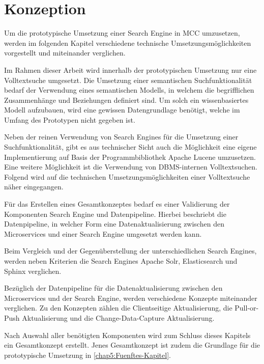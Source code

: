 \chapter{Konzeption\label{chap4:Viertes-Kapitel}}

Um die prototypische Umsetzung einer Search Engine in MCC umzusetzen, werden im folgenden Kapitel verschiedene technische Umsetzungsmöglichkeiten vorgestellt und miteinander verglichen.


Im Rahmen dieser Arbeit wird innerhalb der prototypischen Umsetzung nur eine Volltextsuche umgesetzt. Die Umsetzung einer semantischen Suchfunktionalität bedarf der Verwendung eines semantischen Modells, in welchem die begrifflichen Zusammenhänge und Beziehungen definiert sind. Um solch ein wissenbasiertes Modell aufzubauen, wird eine gewissen Datengrundlage benötigt, welche im Umfang des Prototypen nicht gegeben ist.

Neben der reinen Verwendung von Search Engines für die Umsetzung einer Suchfunktionalität, gibt es aus technischer Sicht auch die Möglichkeit eine eigene Implementierung auf Basis der Programmbibliothek \glqq Apache Lucene\grqq{} umzusetzen. Eine weitere Möglichkeit ist die Verwendung von DBMS-internen Volltextsuchen. Folgend wird auf die technischen Umsetzungsmöglichkeiten einer Volltextsuche näher eingegangen.

Für das Erstellen eines Gesamtkonzeptes bedarf es einer Validierung der Komponenten \glqq Search Engine\grqq{} und \glqq Datenpipeline\grqq{}. Hierbei beschriebt die Datenpipeline, in welcher Form eine Datenaktualisierung zwischen den Microservices und einer Search Engine umgesetzt werden kann.

Beim Vergleich und der Gegenüberstellung der unterschiedlichen Search Engines, werden neben Kriterien die Search Engines \glqq Apache Solr\grqq{}, \glqq Elasticsearch\grqq{} und \glqq Sphinx\grqq{} verglichen.

Bezüglich der Datenpipeline für die Datenaktualisierung zwischen den Microservices und der Search Engine, werden verschiedene Konzepte miteinander verglichen. Zu den Konzepten zählen die \glqq Clientseitige Aktualisierung\grqq{}, die \glqq Pull-or-Push Aktualisierung\grqq{} und die \glqq Change-Data-Capture Aktualisierung\grqq{}.

Nach Auswahl aller benötigten Komponenten wird zum Schluss dieses Kapitels ein Gesamtkonzept erstellt. Jenes Gesamtkonzept ist zudem die Grundlage für die prototypische Umsetzung in \autoref{chap5:Fuenftes-Kapitel}.

